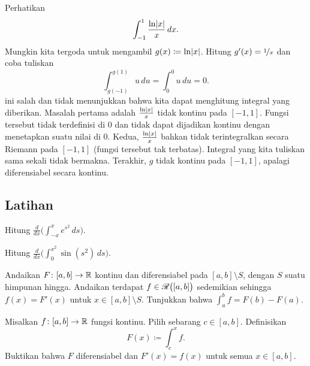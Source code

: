 \begin{example}
Perhatikan
\begin{equation*}
\int_{-1}^{1} \frac{\ln \lvert {x} \rvert}{x} \,dx .
\end{equation*}
Mungkin kita tergoda untuk mengambil $g(x) \coloneqq \ln \lvert {x} \rvert$.  Hitung $g'(x) =
\nicefrac{1}{x}$ dan coba tuliskan
\begin{equation*}
\int_{g(-1)}^{g(1)} u \,du = 
\int_{0}^{0} u \,du = 0. 
\end{equation*}
 ini salah dan tidak menunjukkan
bahwa kita dapat menghitung integral yang diberikan.  Masalah pertama adalah
$\frac{\ln \lvert {x} \rvert}{x}$ tidak kontinu pada $[-1,1]$.
Fungsi tersebut tidak terdefinisi di 0 dan tidak dapat dijadikan kontinu dengan menetapkan suatu nilai di
0.
Kedua, $\frac{\ln \lvert {x} \rvert}{x}$ bahkan tidak terintegralkan secara Riemann pada $[-1,1]$
(fungsi tersebut tak terbatas).
Integral yang kita tuliskan sama sekali tidak bermakna.
Terakhir, $g$ tidak kontinu
pada $[-1,1]$, apalagi diferensiabel secara kontinu.
\end{example}

\subsection{Latihan}

\begin{exercise}
Hitung
$\displaystyle
\frac{d}{dx} \biggl( \int_{-x}^x e^{s^2}\,ds \biggr)$.
\end{exercise}

\begin{exercise}
Hitung
$\displaystyle
\frac{d}{dx} \biggl( \int_{0}^{x^2} \sin(s^2)\,ds \biggr)$.
\end{exercise}

\begin{exercise}
Andaikan $F \colon [a,b] \to {\mathbb{R}}$ kontinu dan diferensiabel
pada $[a,b] \setminus S$, dengan $S$ suatu himpunan hingga.  Andaikan
terdapat $f \in {\mathscr{R}}\bigl([a,b]\bigr)$ sedemikian sehingga $f(x) = F'(x)$ untuk $x \in [a,b]
\setminus S$.  Tunjukkan bahwa
$\int_a^b f = F(b)-F(a)$.
\end{exercise}

\begin{exercise} \label{secondftc:exercise}
Misalkan $f \colon [a,b] \to {\mathbb{R}}$ fungsi kontinu.  Pilih sebarang $c \in [a,b]$.
Definisikan
\begin{equation*}
F(x) \coloneqq \int_c^x f .
\end{equation*}
Buktikan bahwa $F$ diferensiabel dan $F'(x) = f(x)$ untuk semua $x \in
[a,b]$.
\end{exercise}

